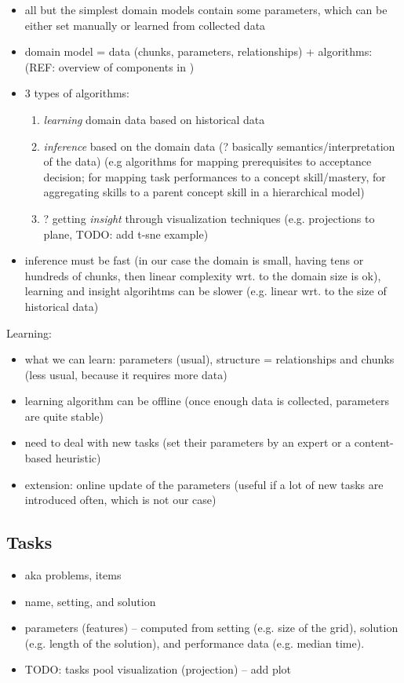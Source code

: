 \begin{itemize}
\item all but the simplest domain models contain some parameters,
  which can be either set manually or learned from collected data
\item domain model = data (chunks, parameters, relationships) + algorithms:
  (REF: overview of components in \cite{pelanek-learner-modeling})
\item 3 types of algorithms:
\begin{enumerate}
\item \emph{learning} domain data based on historical data
\item \emph{inference} based on the domain data
  (? basically semantics/interpretation of the data)
  (e.g algorithms for mapping prerequisites to acceptance decision;
    for mapping task performances to a concept skill/mastery,
    for aggregating skills to a parent concept skill in a hierarchical model)
\item ? getting \emph{insight} through visualization techniques
    (e.g. projections to plane, TODO: add t-sne example)
\end{enumerate}
\item inference must be fast (in our case the domain is small, having tens or
  hundreds of chunks, then linear complexity wrt. to the domain size is ok),
    learning and insight algorihtms can be slower
    (e.g. linear wrt. to the size of historical data)
\end{itemize}

Learning:
\begin{itemize}
\item what we can learn: parameters (usual), structure = relationships and
  chunks (less usual, because it requires more data)
\item learning algorithm can be offline
  (once enough data is collected, parameters are quite stable)
\item need to deal with new tasks (set their parameters by an expert or a content-based heuristic)
\item extension: online update of the parameters (useful if a lot of new tasks
  are introduced often, which is not our case)
\end{itemize}


\subsection{Tasks}

\begin{itemize}
\item aka problems, items
\item name, setting, and solution
\item parameters (features) --
  computed from setting (e.g. size of the grid),
  solution (e.g. length of the solution),
  and performance data (e.g. median time).
\item TODO: tasks pool visualization (projection) -- add plot
\end{itemize}

